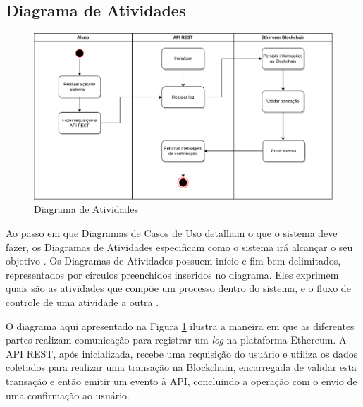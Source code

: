 \newpage
\subsection{Diagrama de Atividades}
\begin{figure}
    \centering
    \includegraphics[width=1\textwidth]{img/Cap3/diagramas/Diagrama de Atividade.png}
    \caption{Diagrama de Atividades}
    \label{fig:diagrama_atividades}
\end{figure}
Ao passo em que Diagramas de Casos de Uso detalham o que o sistema deve fazer, os Diagramas de Atividades especificam como o sistema irá alcançar o seu objetivo \cite{Miles2006-fo}. Os Diagramas de Atividades possuem início e fim bem delimitados, representados por círculos preenchidos inseridos no diagrama. Eles exprimem quais são as atividades que compõe um processo dentro do sistema, e o fluxo de controle de uma atividade a outra \cite{Sommerville2011}.

O diagrama aqui apresentado na Figura \ref{fig:diagrama_atividades} ilustra a maneira em que as diferentes partes realizam comunicação para registrar um \emph{log} na plataforma Ethereum. A API REST, após inicializada, recebe uma requisição do usuário e utiliza os dados coletados para realizar uma transação na Blockchain, encarregada de validar esta transação e então emitir um evento à API, concluindo a operação com o envio de uma confirmação ao usuário.

\newpage
